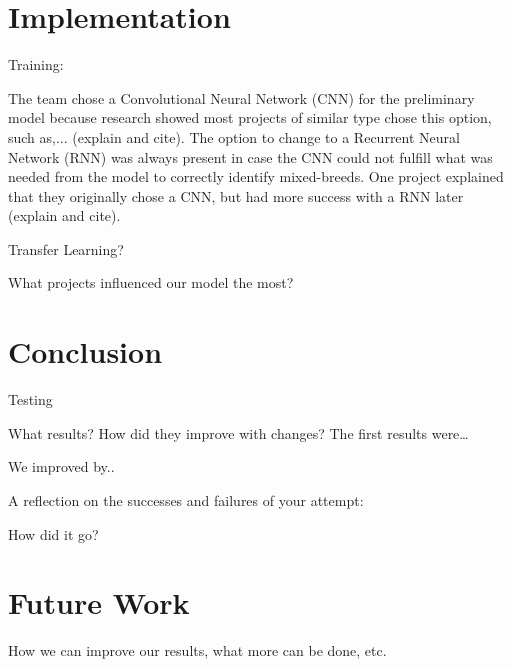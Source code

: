 \documentclass[12pt]{report}
\begin{document}
		\par 
		
\section* {Implementation} 
		
\indent	\par  
	\par Training:
\par The team chose a Convolutional Neural Network (CNN) for the preliminary model because research showed most projects of similar type chose this option, such as,... (explain and cite). The option to change to a Recurrent Neural Network (RNN) was always present in case the CNN could not fulfill what was needed from the model to correctly identify mixed-breeds. One project explained that they originally chose a CNN, but had more success with a RNN later (explain and cite).
\par Transfer Learning?
\par What projects influenced our model the most? 


	
	\begin{figure}[]
\centering 
\begin{subfigure}{.5\textwidth}
\centering

\label{}
\end{subfigure}%

\caption{\label{}}
\end{figure}

\section* {Conclusion}
\indent \indent \par Testing
\par What results? How did they improve with changes? The first results were…
\par We improved by..
\par A reflection on the successes and failures of your attempt:  
\par How did it go?
	

\section* {Future Work}

\par	How we can improve our results, what more can be done, etc. 
\end{document}
